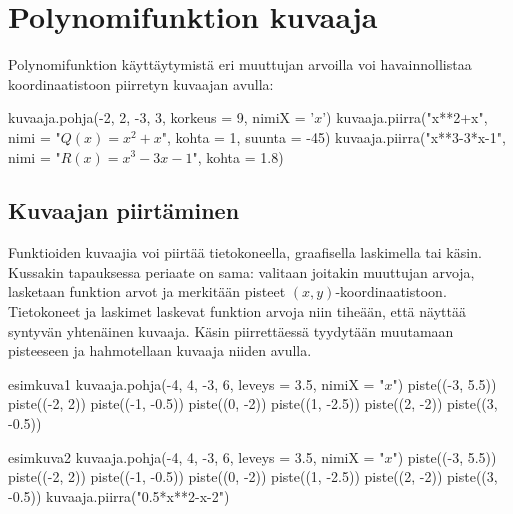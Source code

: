 \section{Polynomifunktion kuvaaja}
Polynomifunktion käyttäytymistä eri muuttujan arvoilla voi havainnollistaa koordinaatistoon piirretyn kuvaajan avulla:



\begin{kuva}
kuvaaja.pohja(-2, 2, -3, 3, korkeus = 9, nimiX = '$x$')
kuvaaja.piirra("x**2+x", nimi = "$Q(x) = x^2+x$", kohta = 1, suunta = -45)
kuvaaja.piirra("x**3-3*x-1", nimi = "$R(x) = x^3-3x-1$", kohta = 1.8)
\end{kuva}


\newpage

\subsection{Kuvaajan piirtäminen}


Funktioiden kuvaajia voi piirtää tietokoneella, graafisella laskimella tai käsin. Kussakin tapauksessa periaate on sama: valitaan joitakin muuttujan arvoja, lasketaan funktion arvot ja merkitään pisteet $(x,y)$-koordinaatistoon. Tietokoneet ja laskimet laskevat funktion arvoja niin tiheään, että näyttää syntyvän yhtenäinen kuvaaja. Käsin piirrettäessä tyydytään muutamaan pisteeseen ja hahmotellaan kuvaaja niiden avulla.

\begin{luoKuva}{esimkuva1}
kuvaaja.pohja(-4, 4, -3, 6, leveys = 3.5, nimiX = "$x$")
piste((-3, 5.5))
piste((-2, 2))
piste((-1, -0.5))
piste((0, -2))
piste((1, -2.5))
piste((2, -2))
piste((3, -0.5))
\end{luoKuva}
\begin{luoKuva}{esimkuva2}
kuvaaja.pohja(-4, 4, -3, 6, leveys = 3.5, nimiX = "$x$")
piste((-3, 5.5))
piste((-2, 2))
piste((-1, -0.5))
piste((0, -2))
piste((1, -2.5))
piste((2, -2))
piste((3, -0.5))
kuvaaja.piirra("0.5*x**2-x-2")
\end{luoKuva}

